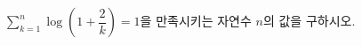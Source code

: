 \hspace*{2mm}\begin{minipage}[t]{\dimexpr\linewidth-2mm\relax}\vspace{0pt}
$\displaystyle\sum_{k=1}^{n}\log\left(1+\dfrac{2}{k}\right)=1$을 만족시키는 자연수 $n$의 값을 구하시오.\end{minipage}

